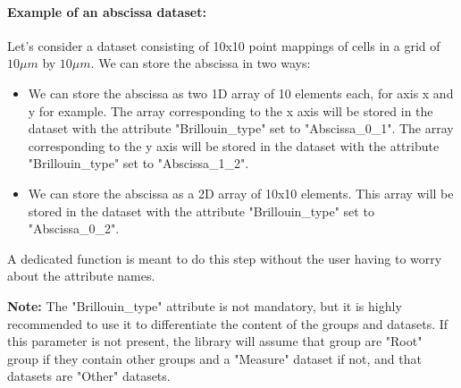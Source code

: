 \paragraph*{Example of an abscissa dataset:}
Let's consider a dataset consisting of 10x10 point mappings of cells in a grid of $10\mu m$ by $10\mu m$. We can store the abscissa in two ways:
\begin{itemize}
    \item We can store the abscissa as two 1D array of 10 elements each, for axis x and y for example. The array corresponding to the x axis will be stored in the dataset with the attribute "Brillouin\_type" set to "Abscissa\_0\_1". The array corresponding to the y axis will be stored in the dataset with the attribute "Brillouin\_type" set to "Abscissa\_1\_2".
    \item We can store the abscissa as a 2D array of 10x10 elements. This array will be stored in the dataset with the attribute "Brillouin\_type" set to "Abscissa\_0\_2".
\end{itemize}
A dedicated function is meant to do this step without the user having to worry about the attribute names. 


\textbf{Note:} The "Brillouin\_type" attribute is not mandatory, but it is highly recommended to use it to differentiate the content of the groups and datasets. If this parameter is not present, the library will assume that group are "Root" group if they contain other groups and a "Measure" dataset if not, and that datasets are "Other" datasets.